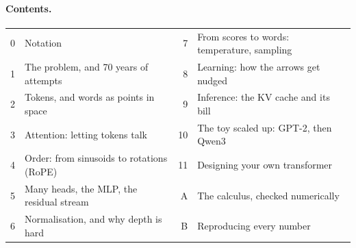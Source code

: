 \paragraph{Contents.}
\begin{center}
\small
\begin{tabular}{@{}r@{\quad}l@{\qquad}r@{\quad}l@{}}
0 & Notation & 7 & From scores to words: temperature, sampling\\
1 & The problem, and 70 years of attempts & 8 & Learning: how the arrows get nudged\\
2 & Tokens, and words as points in space & 9 & Inference: the KV cache and its bill\\
3 & Attention: letting tokens talk & 10 & The toy scaled up: GPT-2, then Qwen3\\
4 & Order: from sinusoids to rotations (RoPE) & 11 & Designing your own transformer\\
5 & Many heads, the MLP, the residual stream & A & The calculus, checked numerically\\
6 & Normalisation, and why depth is hard & B & Reproducing every number\\
\end{tabular}
\end{center}
